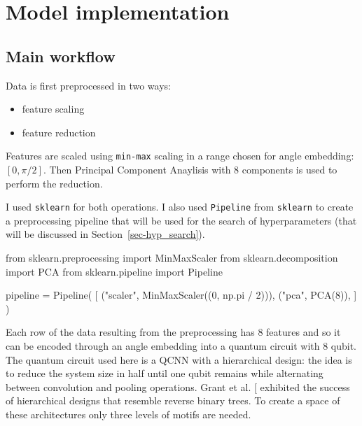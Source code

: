 \documentclass[
  13pt,
  a4paper,
  DIV=11,
  numbers=noendperiod]{scrreprt}
\newenvironment{Shaded}{\begin{snugshade}}{\end{snugshade}}
\newcommand{\DecValTok}[1]{\textcolor[rgb]{0.68,0.00,0.00}{#1}}
\newcommand{\ImportTok}[1]{\textcolor[rgb]{0.00,0.46,0.62}{#1}}
\newcommand{\NormalTok}[1]{\textcolor[rgb]{0.00,0.23,0.31}{#1}}
\newcommand{\OperatorTok}[1]{\textcolor[rgb]{0.37,0.37,0.37}{#1}}
\newcommand{\StringTok}[1]{\textcolor[rgb]{0.13,0.47,0.30}{#1}}
\providecommand{\tightlist}{%
  \setlength{\itemsep}{0pt}\setlength{\parskip}{0pt}}\usepackage{longtable,booktabs,array}
\begin{document}
\section{Model implementation}\label{model-implementation}

\subsection{Main workflow}\label{main-workflow}

Data is first preprocessed in two ways:

\begin{itemize}
\tightlist
\item
  feature scaling\\
\item
  feature reduction
\end{itemize}

Features are scaled using \texttt{min-max} scaling in a range chosen for
angle embedding: \([0, \pi/2]\). Then Principal Component Anaylisis with
8 components is used to perform the reduction.

I used \texttt{sklearn} for both operations. I also used
\texttt{Pipeline} from \texttt{sklearn} to create a preprocessing
pipeline that will be used for the search of hyperparameters (that will
be discussed in Section~\ref{sec-hyp_search}).

\begin{Shaded}
\begin{Highlighting}[numbers=left,,]
\ImportTok{from}\NormalTok{ sklearn.preprocessing }\ImportTok{import}\NormalTok{ MinMaxScaler}
\ImportTok{from}\NormalTok{ sklearn.decomposition }\ImportTok{import}\NormalTok{ PCA}
\ImportTok{from}\NormalTok{ sklearn.pipeline }\ImportTok{import}\NormalTok{ Pipeline}

\NormalTok{pipeline }\OperatorTok{=}\NormalTok{ Pipeline(}
\NormalTok{    [}
\NormalTok{        (}\StringTok{"scaler"}\NormalTok{, MinMaxScaler((}\DecValTok{0}\NormalTok{, np.pi }\OperatorTok{/} \DecValTok{2}\NormalTok{))),}
\NormalTok{        (}\StringTok{"pca"}\NormalTok{, PCA(}\DecValTok{8}\NormalTok{)),}
\NormalTok{    ]}
\NormalTok{)}
\end{Highlighting}
\end{Shaded}

Each row of the data resulting from the preprocessing has 8 features and
so it can be encoded through an angle embedding into a quantum circuit
with 8 qubit. The quantum circuit used here is a QCNN with a
hierarchical design: the idea is to reduce the system size in half until
one qubit remains while alternating between convolution and pooling
operations. Grant et al. {[}\citeproc{ref-grant2018hierarchical}{10}{]}
exhibited the success of hierarchical designs that resemble reverse
binary trees. To create a space of these architectures only three levels
of motifs are needed.
\end{document}

